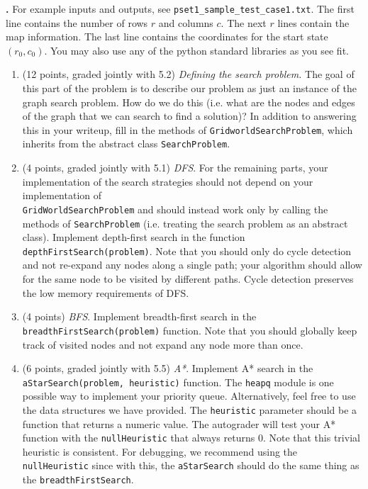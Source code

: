 \documentclass[12pt]{amsart}
\newenvironment{statement}[1]{\smallskip\noindent\color[rgb]{0.0,0.0,0.0} {\bf #1.}}{}
\theoremstyle{definition}
\theoremstyle{remark}
\newcommand{\1}{\mathds{1}}
\begin{document}
\begin{statement}{5}
\noindent
For example inputs and outputs, see \verb|pset1_sample_test_case1.txt|. The first line contains the number of rows $r$ and columns $c$. The next $r$ lines contain the map information. The last line contains the coordinates for the start state $(r_0, c_0)$. You may also use any of the python standard libraries as you see fit.
\end{statement}

\begin{enumerate}
    \item (12 points, graded jointly with 5.2)
\textit{Defining the search problem.} 
The goal of this part of the problem is to describe our problem as just an instance of the graph search problem. How  do we do this (i.e. what are the nodes and edges of the graph that we can search to find a solution)? In addition to answering this in your writeup, fill in the methods of \texttt{GridworldSearchProblem}, which inherits from the abstract class \texttt{SearchProblem}.
    \item (4 points, graded jointly with 5.1) \emph{DFS}. For the remaining parts, your implementation of the search strategies should not depend on your implementation of\\ \texttt{GridWorldSearchProblem} and should instead work only by calling the methods of \texttt{SearchProblem} (i.e. treating the search problem as an abstract class). 
    Implement depth-first search in the function \texttt{depthFirstSearch(problem)}. Note that you should only do cycle detection and not re-expand any nodes along a single path; your algorithm should allow for the same node to be
    visited by different paths. Cycle detection preserves the low memory requirements of DFS.
    \item (4 points) \emph{BFS}. Implement breadth-first search in the \texttt{breadthFirstSearch(problem)} function. Note that you should globally keep track of visited nodes and not expand any node more than once.
    \item (6 points, graded jointly with 5.5)
\emph{A*}. Implement A* search in the\\ \texttt{aStarSearch(problem, heuristic)} function. The \texttt{heapq} module is one possible way to implement your priority queue. Alternatively, feel free to use the data structures we have provided. The \texttt{heuristic} parameter should be a function that returns a numeric value. The autograder will test your A* function with the \texttt{nullHeuristic} that always returns 0. Note that this trivial heuristic is consistent. For debugging, we recommend using the \texttt{nullHeuristic} since with this, the \texttt{aStarSearch} should do the same thing as the \texttt{breadthFirstSearch}.
    

\end{enumerate}
\end{document}
